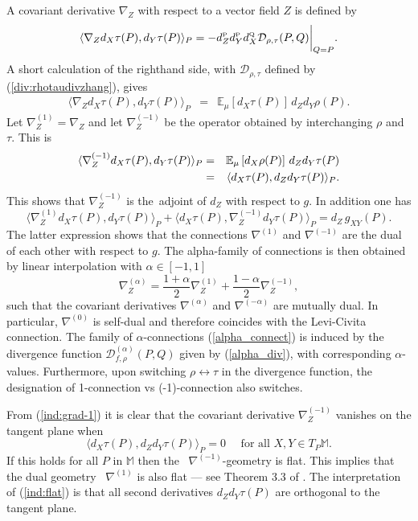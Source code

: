 \documentclass[graybox]{svmult}
\newcommand{\be}{\begin{equation}}
\newcommand{\ee}{\end{equation}}
\newcommand{\beq}{\begin{eqnarray}}
\newcommand{\eeq}{\end{eqnarray}}
\newcommand{\Mo}{\mathbb M}
\newcommand{\Eo}{\mathbb E}
\newcommand{\Ddiv}{\mathcal{D}}
\newcommand{\Dfrechet}{d}  %
\newcommand{\add}[1]{{\color{blue}#1}}
\newcommand{\remove}[1]{{\color{blue}{\st {#1}}}}
\newcommand{\change}[2]{\remove{#1}\,\add{#2}}
\begin{document}
A covariant derivative $\nabla_Z$ with respect to a vector field $Z$ is defined by
\be
\langle \nabla_Z\Dfrechet_X\tau(P),\Dfrechet_Y\tau(P)\rangle_P
=
-\Dfrechet^{\mbox{\tiny P}}_Z
\Dfrechet^{\mbox{\tiny P}}_Y\Dfrechet^{\mbox{\tiny Q}}_X \Ddiv _{\rho,\tau}(P,Q)
\bigg|_{Q=P}.
\nonumber
\ee
A short calculation 
\add {of the righthand side, with $\Ddiv _{\rho,\tau}$ defined by (\ref{div:rhotaudivzhang}), } gives
\beq
\langle\nabla_Z\Dfrechet_X\tau(P),\Dfrechet_Y\tau(P)\rangle_P
&=&
\Eo_\mu \left[\Dfrechet_X\tau(P)\right]
\,\Dfrechet_Z\Dfrechet_Y\rho(P).
\nonumber
\eeq
Let $\nabla^{(1)}_Z=\nabla_Z$ and let $\nabla_Z^{(-1)}$ be the operator
obtained by interchanging $\rho$ and $\tau$.
This is
\beq
\langle\nabla_Z^{(-1)}\Dfrechet_X\tau(P),\Dfrechet_Y\tau(P)\rangle_P
&=&
\Eo_\mu \left[\Dfrechet_X\rho(P)\right]
\,\Dfrechet_Z\Dfrechet_Y\tau(P)\cr
&=&
\langle \Dfrechet_X\tau(P)
,\Dfrechet_Z\Dfrechet_Y\tau(P)\rangle_P.
\label{ind:grad-1}
\eeq
This shows that $\nabla_Z^{(-1)}$ is the \change {hermitian conjugate}{adjoint} of $\Dfrechet_Z$ \add{ with respect to $g$}.
In addition one has
\be
\langle\nabla_Z^{(1)}\Dfrechet_X\tau(P),\Dfrechet_Y\tau(P)\rangle_P
+\langle\Dfrechet_X\tau(P),\nabla_Z^{(-1)}\Dfrechet_Y\tau(P)\rangle_P
=\Dfrechet_Z\, g_{XY}(P).
\label{ind:dual}
\ee
The latter expression shows that the connections $\nabla^{(1)}$
and $\nabla^{(-1)}$ are the dual of each other with respect to $g$.
%
The alpha-family of connections is then obtained by linear interpolation with $\alpha \in [-1,1]$
\be \label{alpha_connect}
\nabla^{(\alpha)}_Z=\frac{1+\alpha}{2}\nabla^{(1)}_Z+\frac{1-\alpha}{2}\nabla^{(-1)}_Z ,
\ee
such that the covariant derivatives $\nabla^{(\alpha)}$ and $\nabla^{(-\alpha)}$ are mutually dual. 
In particular, $\nabla^{(0)}$ is self-dual and therefore coincides with the Levi-Civita
connection. The family of $\alpha$-connections (\ref{alpha_connect}) is induced by the divergence function
$\Ddiv^{(\alpha)}_{f, \rho}(P,Q)$ given by (\ref{alpha_div}), with corresponding $\alpha$-values. Furthermore, upon switching $\rho \leftrightarrow \tau$ in the divergence function, the designation of 1-connection vs (-1)-connection also switches. 

From (\ref {ind:grad-1}) it is clear that the covariant derivative $\nabla_Z^{(-1)}$
vanishes on the tangent plane when
\be
\langle \Dfrechet_X\tau(P)
,\Dfrechet_Z\Dfrechet_Y\tau(P)\rangle_P=0
\quad\mbox{ for all }X,Y\in T_P\Mo.
\label{ind:flat}
\ee
If this holds for all $P$ in $\Mo$ then the 
\change{
$\nabla^{(-1)}_{Z}$}
{
$\nabla^{(-1)}$}-geometry is flat.
This implies that the dual geometry 
\change{
$\nabla^{(1)}_{Z}$}
{
$\nabla^{(1)}$
}
is also flat
--- see Theorem 3.3 of \cite{amarinagaoka2000}.
The interpretation of (\ref {ind:flat}) is that all second derivatives
$\Dfrechet_Z\Dfrechet_Y\tau(P)$ are orthogonal to the tangent plane.
\end{document}
